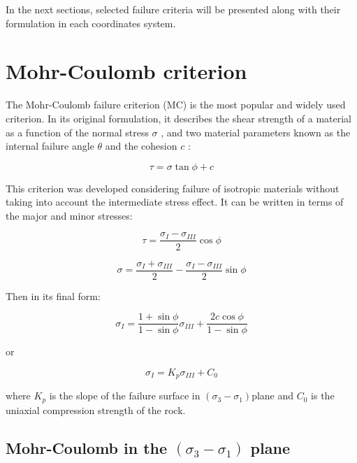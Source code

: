 In the next sections, selected failure criteria will be presented along with their formulation in each coordinates system. 

\section{Mohr-Coulomb criterion}

The Mohr-Coulomb failure criterion (MC) is the most popular and widely used criterion. In its original formulation, it describes the shear strength of a material as a function of the normal stress $\sigma$ , and two material parameters known as the internal failure angle $\theta$ and the cohesion $c$ :

\begin{equation}
    \tau = \sigma \tan \phi + c
\end{equation}

This criterion was developed considering failure of isotropic materials without taking into account the intermediate stress effect. It can be written in terms of the major and minor stresses: 

\begin{equation}
    \tau = \frac{\sigma_I - \sigma_{III}}{2} \cos \phi
\end{equation}

\begin{equation}
    \sigma = \frac{\sigma_I + \sigma_{III}}{2} - \frac{\sigma_I - \sigma_{III}}{2} \sin \phi
\end{equation}

Then in its final form:

\begin{equation} \label{eq2:MCfinalform}
    \sigma_{I}=\frac{1+\sin \phi}{1-\sin \phi} \sigma_{I I I}+\frac{2 c \cos \phi}{1-\sin \phi}
\end{equation}

or

\begin{equation}\label{eq2:MCcondenseform}
    \sigma_I = K_p \sigma_{III} + C_0
\end{equation}

where $K_p$ is the slope of the failure surface in $(\sigma_3 -\sigma_1)$plane and $C_0$ is the uniaxial compression strength of the rock. 

\subsection{Mohr-Coulomb in the \texorpdfstring{$(\sigma_3 -\sigma_1)$}{sigma 3 - sigma 1} plane}

